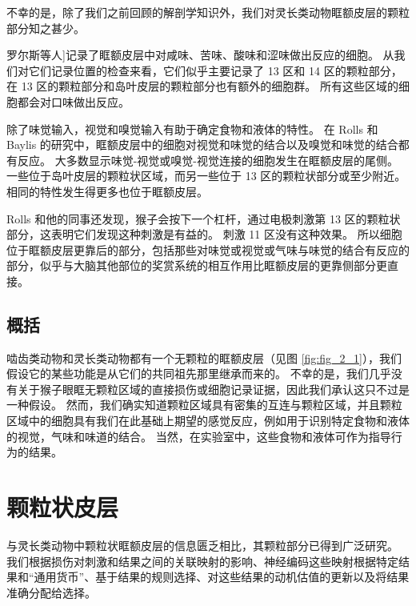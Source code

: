 不幸的是，除了我们之前回顾的解剖学知识外，我们对灵长类动物眶额皮层的颗粒部分知之甚少。\par


罗尔斯等人\cite{rolls1994emotion}]记录了眶额皮层中对咸味、苦味、酸味和涩味做出反应的细胞。
从我们对它们记录位置的检查来看，它们似乎主要记录了 13 区和 14 区的颗粒部分，在 13 区的颗粒部分和岛叶皮层的颗粒部分也有额外的细胞群。
所有这些区域的细胞都会对口味做出反应。\par


除了味觉输入，视觉和嗅觉输入有助于确定食物和液体的特性。
在 Rolls 和 Baylis 的研究中，眶额皮层中的细胞对视觉和味觉的结合以及嗅觉和味觉的结合都有反应。
大多数显示味觉-视觉或嗅觉-视觉连接的细胞发生在眶额皮层的尾侧。
一些位于岛叶皮层的颗粒状区域，而另一些位于 13 区的颗粒状部分或至少附近。
相同的特性发生得更多也位于眶额皮层。\par


Rolls 和他的同事还发现，猴子会按下一个杠杆，通过电极刺激第 13 区的颗粒状部分，这表明它们发现这种刺激是有益的\cite{mora1980electrophysiological}。
刺激 11 区没有这种效果。
所以细胞位于眶额皮层更靠后的部分，包括那些对味觉或视觉或气味与味觉的结合有反应的部分，似乎与大脑其他部位的奖赏系统的相互作用比眶额皮层的更靠侧部分更直接。\par



\subsection{概括}

啮齿类动物和灵长类动物都有一个无颗粒的眶额皮层（见图 \ref{fig:fig_2_1}），我们假设它的某些功能是从它们的共同祖先那里继承而来的。
不幸的是，我们几乎没有关于猴子眼眶无颗粒区域的直接损伤或细胞记录证据，因此我们承认这只不过是一种假设。
然而，我们确实知道颗粒区域具有密集的互连与颗粒区域，并且颗粒区域中的细胞具有我们在此基础上期望的感觉反应，例如用于识别特定食物和液体的视觉，气味和味道的结合。
当然，在实验室中，这些食物和液体可作为指导行为的结果。\par



\section{颗粒状皮层}

与灵长类动物中颗粒状眶额皮层的信息匮乏相比，其颗粒部分已得到广泛研究。
我们根据损伤对刺激和结果之间的关联映射的影响、神经编码这些映射根据特定结果和“通用货币”、基于结果的规则选择、对这些结果的动机估值的更新以及将结果准确分配给选择。



